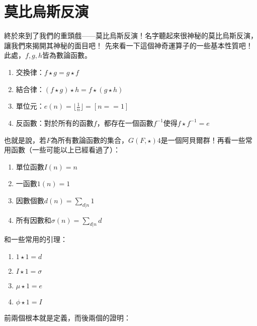 \section{莫比烏斯反演}
	終於來到了我們的重頭戲——莫比烏斯反演！名字聽起來很神秘的莫比烏斯反演，讓我們來揭開其神秘的面目吧！
	先來看一下這個神奇運算子的一些基本性質吧！此處，$f, g, h$皆為數論函數。
	\begin{enumerate}
		\item 交換律：$f \star g = g \star f$
		\item 結合律：$(f \star g) \star h = f \star (g \star h)$
		\item 單位元：$e(n) = \lfloor \frac{1}{n} \rfloor = [n == 1]$
		\item 反函數：對於所有的函數$f$，都存在一個函數$f^{-1}$使得$f \star f^{-1} = e$ 
	\end{enumerate}
	也就是說，若$F$為所有數論函數的集合，$G(F, \star)4$是一個阿貝爾群！再看一些常用函數（一些可能以上已經看過了）：
	\begin{enumerate}
		\item 單位函數$I(n) = n$
		\item 一函數$1(n) = 1$
		\item 因數個數$d(n) = \sum_{d | n} 1$
		\item 所有因數和$\sigma(n) = \sum_{d | n} d$
	\end{enumerate}
	和一些常用的引理：
	\begin{enumerate}
		\item $1 \star 1 = d$
		\item $I \star 1 = \sigma$
		\item $\mu \star 1 = e$
		\item $\phi \star 1 = I$
	\end{enumerate}
	前兩個根本就是定義，而後兩個的證明：
